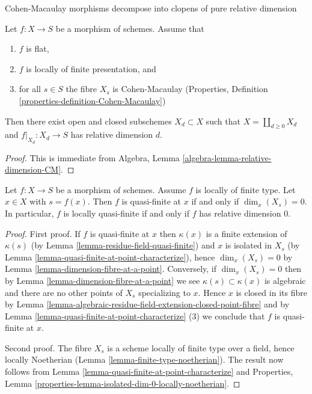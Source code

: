 \begin{lemma}
\label{lemma-flat-finite-presentation-CM-fibres-relative-dimension}
\begin{slogan}
Cohen-Macaulay morphisms decompose into clopens of pure relative dimension
\end{slogan}
Let $f : X \to S$ be a morphism of schemes.
Assume that
\begin{enumerate}
\item $f$ is flat,
\item $f$ is locally of finite presentation, and
\item for all $s \in S$ the fibre $X_s$ is Cohen-Macaulay
(Properties, Definition \ref{properties-definition-Cohen-Macaulay})
\end{enumerate}
Then there exist open and closed subschemes $X_d \subset X$
such that $X = \coprod_{d \geq 0} X_d$ and $f|_{X_d} : X_d \to S$
has relative dimension $d$.
\end{lemma}

\begin{proof}
This is immediate from
Algebra, Lemma
\ref{algebra-lemma-relative-dimension-CM}.
\end{proof}

\begin{lemma}
\label{lemma-locally-quasi-finite-rel-dimension-0}
Let $f : X \to S$ be a morphism of schemes.
Assume $f$ is locally of finite type.
Let $x \in X$ with $s = f(x)$.
Then $f$ is quasi-finite at $x$ if and only if $\dim_x(X_s) = 0$.
In particular, $f$ is locally quasi-finite if and only if $f$ has relative
dimension $0$.
\end{lemma}

\begin{proof}
First proof.
If $f$ is quasi-finite at $x$ then $\kappa(x)$ is a finite extension of
$\kappa(s)$ (by
Lemma \ref{lemma-residue-field-quasi-finite})
and $x$ is isolated in $X_s$ (by
Lemma \ref{lemma-quasi-finite-at-point-characterize}),
hence $\dim_x(X_s) = 0$ by
Lemma \ref{lemma-dimension-fibre-at-a-point}.
Conversely, if $\dim_x(X_s) = 0$ then by
Lemma \ref{lemma-dimension-fibre-at-a-point}
we see $\kappa(s) \subset \kappa(x)$ is algebraic and
there are no other points of $X_s$ specializing to $x$.
Hence $x$ is closed in its fibre by
Lemma \ref{lemma-algebraic-residue-field-extension-closed-point-fibre}
and by
Lemma \ref{lemma-quasi-finite-at-point-characterize} (3)
we conclude that $f$ is quasi-finite at $x$.

\medskip\noindent
Second proof. The fibre $X_s$ is a scheme locally of finite type over a field,
hence locally Noetherian (Lemma \ref{lemma-finite-type-noetherian}).
The result now follows from
Lemma \ref{lemma-quasi-finite-at-point-characterize}
and Properties, Lemma \ref{properties-lemma-isolated-dim-0-locally-noetherian}.
\end{proof}

